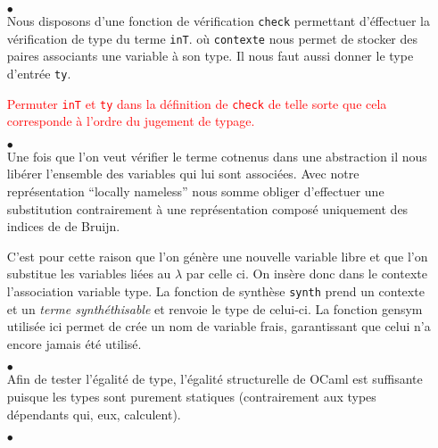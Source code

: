 \documentclass {article}
\newcommand{\codefrom}[3]
           {}
\theoremstyle{definition}
\theoremstyle{remark}
\newcommand{\todo}[1]{\textcolor{red}{#1}}
\newcommand{\fun}[1]{\lstinline!#1!}
\begin{document}
\begin{itemize}
  
\item[$\bullet$] \\
  
  Nous disposons d'une fonction de vérification \lstinline!check!
  permettant d'éffectuer la vérification de type du terme \fun{inT}.
  où \fun{contexte} nous permet de stocker
  des paires associants une variable à son type. Il nous faut aussi
  donner le type d'entrée \fun{ty}.
    
  \todo{Permuter \lstinline!inT! et \lstinline!ty! dans la définition de
    \lstinline!check! de telle sorte que cela corresponde à l'ordre du
    jugement de typage.}
  \codefrom{typed}{lambda}{check_def} 
  
\item[$\bullet$]  \\
  
  Une fois que l'on veut vérifier le terme cotnenus dans une abstraction il nous libérer l'ensemble des variables
  qui lui sont associées. Avec notre représentation ``locally nameless'' nous somme obliger d'effectuer une substitution
  contrairement à une représentation composé uniquement des indices de de Bruijn.
  
  C'est pour cette raison que l'on génère une nouvelle variable libre et que l'on substitue les variables liées 
  au $\lambda$ par celle ci. On insère donc dans le contexte l'association variable type.
  La fonction de synthèse \lstinline!synth! prend un contexte et un
  \emph{terme synthéthisable} et renvoie le type de celui-ci.
  La fonction gensym utilisée ici permet de crée un nom de variable frais, garantissant que celui n'a encore jamais
été utilisé. 
%
 \codefrom{typed}{lambda}{check_abs}

\item[$\bullet$]  \\


Afin de tester l'égalité de type, l'égalité structurelle de OCaml est
suffisante puisque les types sont purement statiques (contrairement
aux types dépendants qui, eux, calculent).
%
\codefrom{typed}{lambda}{check_inv}
  

\item[$\bullet$] \\


\end{itemize}
\end{document}
